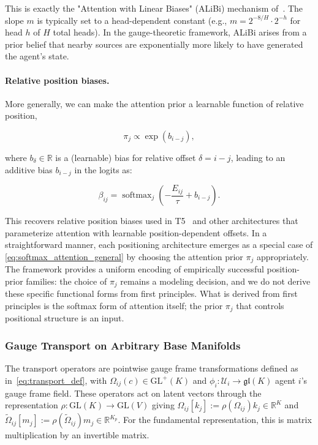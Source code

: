 \documentclass[11pt]{article}
\begin{document}
This is exactly the "Attention with Linear Biases" (ALiBi) mechanism of~\cite{press2022train}. The slope $m$ is typically set to a head-dependent constant (e.g., $m = 2^{-8/H} \cdot 2^{-h}$ for head $h$ of $H$ total heads). In the gauge-theoretic framework, ALiBi arises from a prior belief that nearby sources are exponentially more likely to have generated the agent's state.

\paragraph{Relative position biases.}
More generally, we can make the attention prior a learnable function of relative position,

\begin{equation}
\pi_j \propto \exp(b_{i-j}),
\label{eq:relative_bias_prior}
\end{equation}

where $b_\delta \in \mathbb{R}$ is a (learnable) bias for relative offset $\delta = i - j$, leading to an additive bias $b_{i-j}$ in the logits as:

\begin{equation}
\beta_{ij} = \operatorname{softmax}_j\left(-\frac{E_{ij}}{\tau} + b_{i-j}\right).
\label{eq:relative_bias_attention}
\end{equation}

This recovers relative position biases used in T5~\cite{raffel2020exploring} and other architectures that parameterize attention with learnable position-dependent offsets. In a straightforward manner, each positioning architecture emerges as a special case of \eqref{eq:softmax_attention_general} by choosing the attention prior $\pi_j$ appropriately. The framework provides a uniform encoding of empirically successful position-prior families: the choice of $\pi_j$ remains a modeling decision, and we do not derive these specific functional forms from first principles. What is derived from first principles is the softmax form of attention itself; the prior $\pi_j$ that controls positional structure is an input.

\subsubsection{Gauge Transport on Arbitrary Base Manifolds}
\label{sec:gauge_transport_arbitrary}

The transport operators are pointwise gauge frame transformations defined as in~\eqref{eq:transport_def}, with $\Omega_{ij}(c) \in \mathrm{GL}^+(K)$ and $\phi_i: \mathcal{U}_i \to \mathfrak{gl}(K)$ agent $i$'s gauge frame field. These operators act on latent vectors through the representation $\rho: \mathrm{GL}(K) \to \mathrm{GL}(V)$ giving $\Omega_{ij}[k_j] := \rho(\Omega_{ij})  k_j \in \mathbb{R}^{K}$ and $\tilde{\Omega}_{ij}[m_j] := \rho(\tilde{\Omega}_{ij})  m_j \in \mathbb{R}^{K_p}$. For the fundamental representation, this is matrix multiplication by an invertible matrix.
\end{document}
